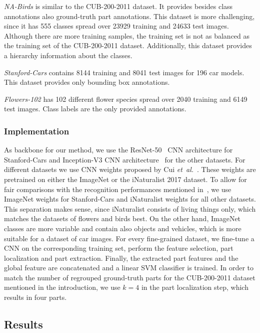 \documentclass[runningheads]{llncs}
\newcommand{\etal}{\emph{et~al.}}
\begin{document}
\emph{NA-Birds} \cite{NABirds} is similar to the CUB-200-2011 dataset.
It provides besides class annotations also ground-truth part annotations.
This dataset is more challenging, since it has \num{555} classes spread over \num{23929} training and \num{24633} test images.
Although there are more training samples, the training set is not as balanced as the training set of the CUB-200-2011 dataset.
Additionally, this dataset provides a hierarchy information about the classes.

\emph{Stanford-Cars} \cite{StanfordCars} contains \num{8144} training and \num{8041} test images for \num{196} car models.
This dataset provides only bounding box annotations.

\emph{Flowers-102} \cite{Flowers102} has \num{102} different flower species spread over \num{2040} training and \num{6149} test images. Class labels are the only provided annotations.


\subsubsection{Implementation}
\label{ssub:implementation}
As backbone for our method, we use the ResNet-50~\cite{he2016resnet} CNN architecture for Stanford-Cars and Inception-V3 CNN architecture~\cite{Szegedy_2016_CVPR} for the other datasets.
For different datasets we use CNN weights proposed by Cui \etal~\cite{Cui_2018_CVPR_large}.
These weights are pretrained on either the ImageNet or the iNaturalist 2017 dataset.
To allow for fair comparisons with the recognition performances mentioned in~\cite{Cui_2018_CVPR_large}, we use ImageNet weights for Stanford-Cars and iNaturalist weights for all other datasets.
This separation makes sense, since iNaturalist consists of living things only, which matches the datasets of flowers and birds best.
On the other hand, ImageNet classes are more variable and contain also objects and vehicles, which is more suitable for a dataset of car images.
For every fine-grained dataset, we fine-tune a CNN on the corresponding training set, perform the feature selection, part localization and part extraction.
Finally, the extracted part features and the global feature are concatenated and a linear SVM classifier is trained.
In order to match the number of regrouped ground-truth parts for the CUB-200-2011 dataset mentioned in the introduction, we use $k=4$ in the part localization step, which results in four parts.

\subsection{Results}
\label{sub:results}
\end{document}
